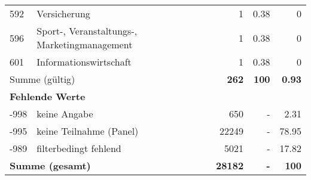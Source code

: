 \begin{longtable}{lXrrr}
        592 & \multicolumn{1}{X}{Versicherung} & %
          \num{1} &
          \num[round-mode=places,round-precision=2]{0,38} &
          \num[round-mode=places,round-precision=2]{0} \\

        596 & \multicolumn{1}{X}{Sport-, Veranstaltungs-, Marketingmanagement} & %
          \num{1} &
          \num[round-mode=places,round-precision=2]{0,38} &
          \num[round-mode=places,round-precision=2]{0} \\

        601 & \multicolumn{1}{X}{Informationswirtschaft} & %
          \num{1} &
          \num[round-mode=places,round-precision=2]{0,38} &
          \num[round-mode=places,round-precision=2]{0} \\

     \midrule
     \multicolumn{2}{l}{Summe (gültig)} &
       \textbf{\num{262}} &
     \textbf{100} &
       \textbf{\num[round-mode=places,round-precision=2]{0,93}} \\
     \multicolumn{5}{l}{\textbf{Fehlende Werte}}\\
       -998 &
       keine Angabe &
         \num{650} &
        - &
         \num[round-mode=places,round-precision=2]{2,31} \\
       -995 &
       keine Teilnahme (Panel) &
         \num{22249} &
        - &
         \num[round-mode=places,round-precision=2]{78,95} \\
       -989 &
       filterbedingt fehlend &
         \num{5021} &
        - &
         \num[round-mode=places,round-precision=2]{17,82} \\
     \midrule
     \multicolumn{2}{l}{\textbf{Summe (gesamt)}} &
          \textbf{\num{28182}} &
        \textbf{-} &
        \textbf{100} \\
     \bottomrule
     \end{longtable}
     
